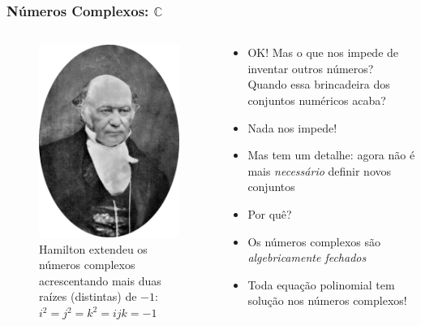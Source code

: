 \documentclass[usenames,dvipsnames,svgnames]{beamer}
\begin{document}
\begin{frame}
	\frametitle{Números Complexos: $\mathbb{C}$}

	\begin{columns}[t]
	\begin{column}{.3\textwidth}
		\begin{figure}
			\includegraphics[width=0.9\linewidth]{pictures/Hamilton}
			\caption{\small Hamilton extendeu os números complexos acrescentando mais duas raízes (distintas) de $-1$: $i^2 = j^2 = k^2 = ijk = -1$}
		\end{figure}
	\end{column}
	\begin{column}{.7\textwidth}
		\small
		\begin{itemize}
		\item OK! Mas o que nos impede de inventar outros números? Quando essa brincadeira dos conjuntos numéricos acaba?
		\item Nada nos impede!
		\item Mas tem um detalhe: agora não é mais \emph{necessário} definir novos conjuntos
		\item Por quê?
		\item {\color{red}Os números complexos são \emph{algebricamente fechados}}
		\item Toda equação polinomial tem solução nos números complexos!
		\end{itemize}
	\end{column}
	\end{columns}

\end{frame}
\end{document}
